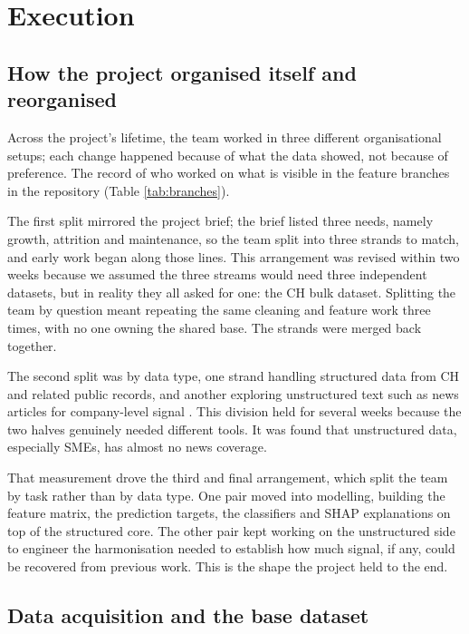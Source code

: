 \documentclass[    author={Samuel Menon Demelo; Sneha Saphala Ram Prasad; 
Viktor Ander Lindholm; Vishal Khatri},
               supervisor={Prof. Fernando Moreno-Pino},
                   degree={MSc},
                    title={Lloyds Commercial Banking Intelligence},
                 subtitle={Ranking SME Lending, Risk and Growth Prospects for Lloyds Banking Group},
                     type={},
                     year={2026}]{dissertation}
\begin{document}
\chapter{Execution}
\label{chap:execution}

\section{How the project organised itself and reorganised}
\label{sec:orgs}
Across the project's lifetime, the team worked in three different organisational setups; each change happened because of what the data showed, not because of preference. The record of who worked on what is visible in the feature branches in the repository (Table \ref{tab:branches}).

The first split mirrored the project brief; the brief listed three needs, namely growth, attrition and maintenance, so the team split into three strands to match, and early work began along those lines. This arrangement was revised within two weeks because we assumed the three streams would need three independent datasets, but in reality they all asked for one: the CH bulk dataset\cite{companieshouse_api}. Splitting the team by question meant repeating the same cleaning and feature work three times, with no one owning the shared base. The strands were merged back together.

The second split was by data type, one strand handling structured data from CH and related public records, and another exploring unstructured text such as news articles for company-level signal \cite{guardian_api, newsapi}. This division held for several weeks because the two halves genuinely needed different tools. It was found that unstructured data, especially SMEs, has almost no news coverage. 

That measurement drove the third and final arrangement, which split the team by task rather than by data type. One pair moved into modelling, building the feature matrix, the prediction targets, the classifiers and SHAP explanations on top of the structured core. The other pair kept working on the unstructured side to engineer the harmonisation needed to establish how much signal, if any, could be recovered from previous work. This is the shape the project held to the end.

\section{Data acquisition and the base dataset}
\end{document}
